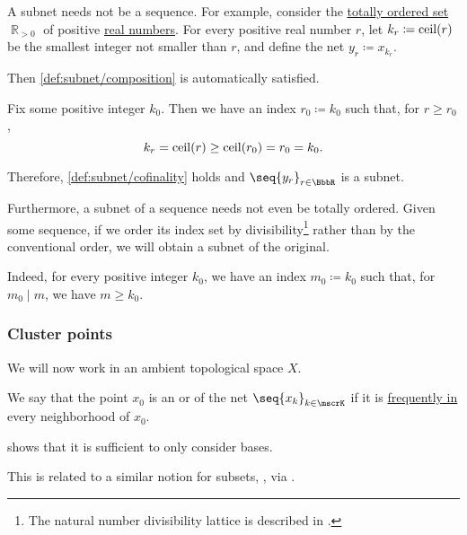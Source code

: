 \begin{example}
\begin{thmenum}
    A subnet needs not be a sequence. For example, consider the \hyperref[def:totally_ordered_set]{totally ordered set} \( \BbbR_{>0} \) of positive \hyperref[def:real_numbers]{real numbers}. For every positive real number \( r \), let \( k_r \coloneqq \operatorname{ceil}(r) \) be the smallest integer not smaller than \( r \), and define the net \( y_r \coloneqq x_{k_r} \).

    Then \ref{def:subnet/composition} is automatically satisfied.

    Fix some positive integer \( k_0 \). Then we have an index \( r_0 \coloneqq k_0 \) such that, for \( r \geq r_0 \),
    \begin{equation*}
      k_r = \operatorname{ceil}(r) \geq \operatorname{ceil}(r_0) = r_0 = k_0.
    \end{equation*}

    Therefore, \ref{def:subnet/cofinality} holds and \( \seq{ y_r }_{r \in \BbbR} \) is a subnet.

     Furthermore, a subnet of a sequence needs not even be totally ordered. Given some sequence, if we order its index set by divisibility\footnote{The natural number divisibility lattice is described in .} rather than by the conventional order, we will obtain a subnet of the original.

    Indeed, for every positive integer \( k_0 \), we have an index \( m_0 \coloneqq k_0 \) such that, for \( m_0 \mid m \), we have \( m \geq k_0 \).
  \end{thmenum}
\end{example}

\subsubsection{Cluster points}

We will now work in an ambient topological space \( X \).

\begin{definition}\label{def:net_cluster_point}
  We say that the point \( x_0 \) is an  or  of the net \( \seq{ x_k }_{k \in \mscrK} \) if it is \hyperref[def:net_frequently_in]{frequently in} every neighborhood of \( x_0 \).
\end{definition}
\begin{comments}
  \item {} shows that it is sufficient to only consider bases.
  \item This is related to a similar notion for subsets, , via .
\end{comments}

